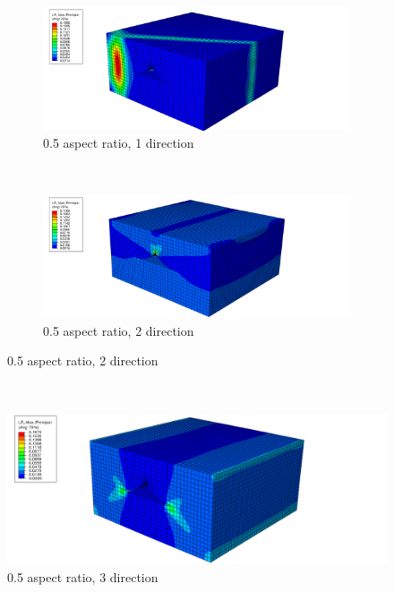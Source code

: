 \begin{figure}
  \begin{subfigure}[b]{0.70\textwidth}
    \includegraphics[width=\textwidth]{chapter_7_non-elasticmodelling/figures/05p1.png}
    \caption{0.5 aspect ratio, 1 direction}
  \end{subfigure}
  \\
    \begin{subfigure}[b]{0.70\textwidth}
    \includegraphics[width=\textwidth]{chapter_7_non-elasticmodelling/figures/05p2.png}
    \caption{0.5 aspect ratio, 2 direction}
  \end{subfigure}
  \end{figure}
  \\
  \begin{subfigure}[b]{0.70\textwidth}
    \includegraphics[width=\textwidth]{chapter_7_non-elasticmodelling/figures/05p3.png}
    \caption{0.5 aspect ratio, 3 direction}
  \end{subfigure}
  \\
